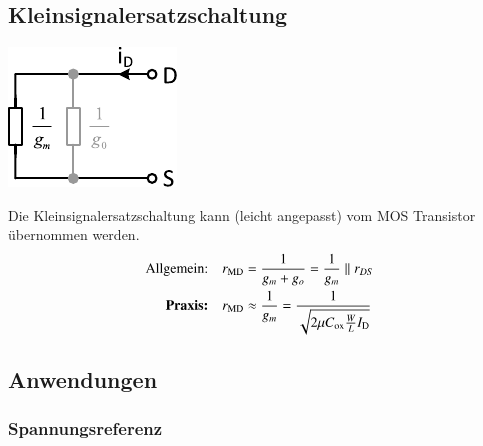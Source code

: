\subsection{Kleinsignalersatzschaltung}

\begin{minipage}[t]{0.3\columnwidth}
    \includegraphics[width=\columnwidth, align=t]{images/04_MOS_diode_ersatzschaltung_vereinfacht.pdf}
\end{minipage}
\hfill
\begin{minipage}[t]{0.65\columnwidth}
    Die Kleinsignalersatzschaltung kann (leicht angepasst) vom MOS Transistor übernommen werden.
    \begin{align*}
        \text{Allgemein:} \quad             r_\text{\rm MD}  &= \frac{1}{g_m + g_o} = \frac{1}{g_m} \parallel r_{DS} \\
        \text{\textbf{Praxis:}} \quad       r_\text{\rm MD} &\approx \frac{1}{g_m} = \frac{1}{\sqrt{2 \mu C_\text{ox} \frac{W}{L} I_\text{D}}}
    \end{align*}

\end{minipage}


\subsection{Anwendungen}

\subsubsection{Spannungsreferenz}
\label{Spannungsreferenz}

